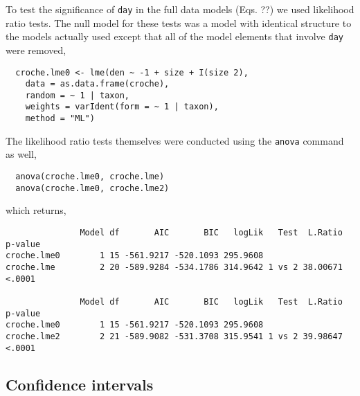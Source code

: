 \documentclass[12pt]{ecologyFORAPPENDIX}
\begin{document}
To test the significance of \texttt{day} in the full data models (Eqs. ??) we used likelihood ratio tests.  The null model for these tests was a model with identical structure to the models actually used except that all of the model elements that involve \texttt{day} were removed,
\singlespace 
\begin{verbatim}
  croche.lme0 <- lme(den ~ -1 + size + I(size 2),
    data = as.data.frame(croche),
    random = ~ 1 | taxon,
    weights = varIdent(form = ~ 1 | taxon),
    method = "ML")
\end{verbatim}
\doublespace
The likelihood ratio tests themselves were conducted using the \texttt{anova} command as well,
\vspace{-16pt}
\singlespace 
\begin{verbatim}
  anova(croche.lme0, croche.lme)
  anova(croche.lme0, croche.lme2)
\end{verbatim}
\doublespace
which returns,
\vspace{-16pt}
\singlespace 
\begin{verbatim}
               Model df       AIC       BIC   logLik   Test  L.Ratio p-value
croche.lme0        1 15 -561.9217 -520.1093 295.9608                        
croche.lme         2 20 -589.9284 -534.1786 314.9642 1 vs 2 38.00671  <.0001

               Model df       AIC       BIC   logLik   Test  L.Ratio p-value
croche.lme0        1 15 -561.9217 -520.1093 295.9608                        
croche.lme2        2 21 -589.9082 -531.3708 315.9541 1 vs 2 39.98647  <.0001
\end{verbatim}
\doublespace

\subsection{Confidence intervals}
\end{document}
